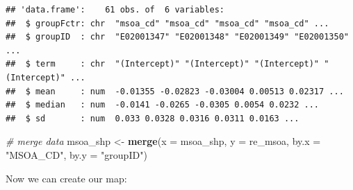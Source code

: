 \documentclass[]{book}
\newenvironment{Shaded}{\begin{snugshade}}{\end{snugshade}}
\newcommand{\KeywordTok}[1]{\textcolor[rgb]{0.13,0.29,0.53}{\textbf{#1}}}
\newcommand{\DataTypeTok}[1]{\textcolor[rgb]{0.13,0.29,0.53}{#1}}
\newcommand{\StringTok}[1]{\textcolor[rgb]{0.31,0.60,0.02}{#1}}
\newcommand{\CommentTok}[1]{\textcolor[rgb]{0.56,0.35,0.01}{\textit{#1}}}
\newcommand{\OperatorTok}[1]{\textcolor[rgb]{0.81,0.36,0.00}{\textbf{#1}}}
\newcommand{\NormalTok}[1]{#1}
\begin{document}
\begin{Shaded}
\end{Shaded}

\begin{verbatim}
## 'data.frame':    61 obs. of  6 variables:
##  $ groupFctr: chr  "msoa_cd" "msoa_cd" "msoa_cd" "msoa_cd" ...
##  $ groupID  : chr  "E02001347" "E02001348" "E02001349" "E02001350" ...
##  $ term     : chr  "(Intercept)" "(Intercept)" "(Intercept)" "(Intercept)" ...
##  $ mean     : num  -0.01355 -0.02823 -0.03004 0.00513 0.02317 ...
##  $ median   : num  -0.0141 -0.0265 -0.0305 0.0054 0.0232 ...
##  $ sd       : num  0.033 0.0328 0.0316 0.0311 0.0163 ...
\end{verbatim}

\begin{Shaded}
\begin{Highlighting}[]
\CommentTok{# merge data}
\NormalTok{msoa_shp <-}\StringTok{ }\KeywordTok{merge}\NormalTok{(}\DataTypeTok{x =}\NormalTok{ msoa_shp, }\DataTypeTok{y =}\NormalTok{ re_msoa, }\DataTypeTok{by.x =} \StringTok{"MSOA_CD"}\NormalTok{, }\DataTypeTok{by.y =} \StringTok{"groupID"}\NormalTok{)}
\end{Highlighting}
\end{Shaded}

Now we can create our map:
\end{document}
